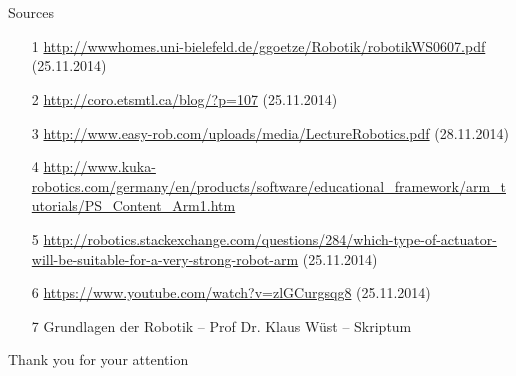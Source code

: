 \documentclass[%
  professionalfonts,%
  xcolor={%
    usenames,%
    dvipsnames,%
    svgnames,%
    table,%
    hyperref%
  }%
]{beamer}
\begin{document}
\section{}
\begin{frame}{Sources}
\begin{itemize}
  \item[1] \url{http://wwwhomes.uni-bielefeld.de/ggoetze/Robotik/robotikWS0607.pdf} (25.11.2014)
  \item[2] \url{http://coro.etsmtl.ca/blog/?p=107} (25.11.2014)
  \item[3] \url{http://www.easy-rob.com/uploads/media/LectureRobotics.pdf} (28.11.2014)
  \item[4] \url{ http://www.kuka-robotics.com/germany/en/products/software/educational_framework/arm_tutorials/PS_Content_Arm1.htm}
  \item[5] \url{http://robotics.stackexchange.com/questions/284/which-type-of-actuator-will-be-suitable-for-a-very-strong-robot-arm} (25.11.2014)
  \item[6] \url{https://www.youtube.com/watch?v=zlGCurgsqg8} (25.11.2014)
  \item[7] Grundlagen der Robotik – Prof Dr. Klaus Wüst – Skriptum
\end{itemize}
\end{frame}


\begin{frame}
\Huge{\centerline{Thank you for your attention}}
\end{frame}
\end{document}
